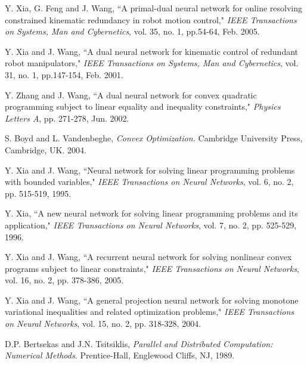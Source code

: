 \documentclass[conference]{IEEEtran}
\begin{document}
\begin{thebibliography}{22}
 Y. Xia, G. Feng and J. Wang, ``A primal-dual neural network for online resolving constrained kinematic redundancy in robot motion control,"
        {\it IEEE Transactions on Systems, Man and Cybernetics}, vol. 35, no. 1, pp.54-64, Feb. 2005.

 Y. Xia and J. Wang, ``A dual neural network for kinematic control of redundant robot manipulators,"
        {\it IEEE Transactions on Systems, Man and Cybernetics}, vol. 31, no. 1, pp.147-154, Feb. 2001.

 Y. Zhang and J. Wang, ``A dual neural network for convex quadratic programming subject to linear equality and inequality constraints,"
        {\it Physics Letters A}, pp. 271-278, Jun. 2002.

 S. Boyd and L. Vandenbeghe,
        {\it Convex Optimization.}
        Cambridge University Press, Cambridge, UK. 2004.

 Y. Xia and J. Wang, ``Neural network for solving linear programming problems with bounded variables,"
        {\it IEEE Transactions on Neural Networks}, vol. 6, no. 2, pp. 515-519, 1995.

 Y. Xia, ``A new neural network for solving linear programming problems and its application,"
        {\it IEEE Transactions on Neural Networks}, vol. 7, no. 2, pp. 525-529, 1996.

 Y. Xia and J. Wang, ``A recurrent neural network for solving nonlinear convex programs subject to linear constraints,"
        {\it IEEE Transactions on Neural Networks}, vol. 16, no. 2, pp. 378-386, 2005.

 Y. Xia and J. Wang, ``A general projection neural network for solving monotone variational inequalities and related optimization problems,"
        {\it IEEE Transactions on Neural Networks}, vol. 15, no. 2, pp. 318-328, 2004.



 D.P. Bertsekas and J.N. Tsitsiklis,
        {\it Parallel and Distributed Computation: Numerical Methods.}
        Prentice-Hall, Englewood Cliffs, NJ, 1989.



\end{thebibliography}

\end{document}
